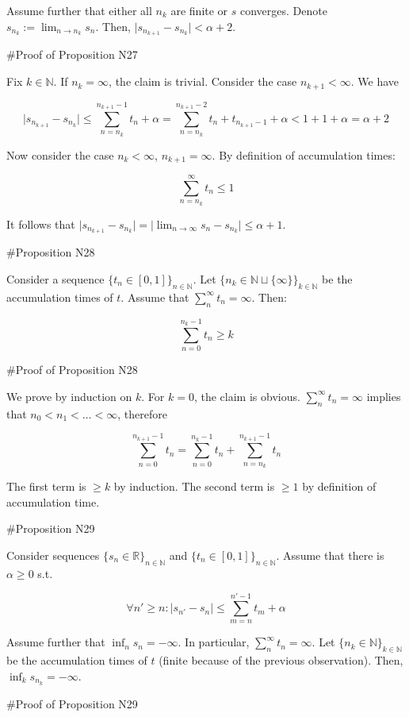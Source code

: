 \documentclass[a4paper]{article}
\newcommand{\Nats}{\mathbb{N}}
\newcommand{\Reals}{\mathbb{R}}
\newcommand{\Abs}[1]{\lvert #1 \rvert}
\begin{document}
Assume further that either all ${n_{k}}$ are finite or $s$ converges. Denote $s_{n_k}:=\lim_{n \rightarrow n_k} s_n$. Then, ${\Abs{s_{n_{k+1}}-s_{n_k}} < \alpha + 2}$.

\#Proof of Proposition N27

Fix ${k \in \Nats}$. If ${n_k = \infty}$, the claim is trivial. Consider the case ${n_{k+1} < \infty}$. We have

$$\Abs{s_{n_{k+1}}-s_{n_k}} \leq \sum_{n=n_k}^{n_{k+1}-1} t_n + \alpha = \sum_{n=n_k}^{n_{k+1}-2} t_n + t_{n_{k+1}-1} + \alpha < 1+1 + \alpha= \alpha + 2$$

Now consider the case ${n_k < \infty}$, ${n_{k+1} = \infty}$. By definition of accumulation times:

$$\sum_{n=n_k}^{\infty} t_n \leq 1$$

It follows that $\Abs{s_{n_{k+1}}-s_{n_k}} = \Abs{\lim_{n \rightarrow \infty} s_{n}-s_{n_k}} \leq \alpha + 1$.

\#Proposition N28

Consider a sequence ${\{t_n \in [0,1]\}_{n \in \Nats}}$. Let ${\{n_k \in \Nats \sqcup \{\infty\}\}_{k \in \Nats}}$ be the accumulation times of ${t}$. Assume that ${\sum_n^\infty t_n = \infty}$. Then:

$$\sum_{n = 0}^{n_k - 1} t_n \geq k$$

\#Proof of Proposition N28

We prove by induction on ${k}$. For ${k=0}$, the claim is obvious. ${\sum_n^\infty t_n = \infty}$ implies that ${n_0 < n_1 < \ldots < \infty}$, therefore

$$\sum_{n = 0}^{n_{k+1} - 1} t_n = \sum_{n = 0}^{n_{k} - 1} t_n + \sum_{n = n_k}^{n_{k+1} - 1} t_n$$

The first term is ${\geq k}$ by induction. The second term is ${\geq 1}$ by definition of accumulation time.

\#Proposition N29

Consider sequences ${\{s_n \in \Reals\}_{n \in \Nats}}$ and ${\{t_n \in [0,1]\}_{n \in \Nats}}$. Assume that there is ${\alpha \geq 0}$ s.t.

$${\forall n' \geq n: \Abs{s_{n'}-s_n} \leq \sum_{m=n}^{n'-1} t_m + \alpha}$$

Assume further that ${\inf_n s_n = -\infty}$. In particular, ${\sum_n^\infty t_n = \infty}$. Let ${\{n_k \in \Nats\}_{k \in \Nats}}$ be the accumulation times of ${t}$ (finite because of the previous observation).  Then, ${\inf_k s_{n_k} = -\infty}$.

\#Proof of Proposition N29
\end{document}

